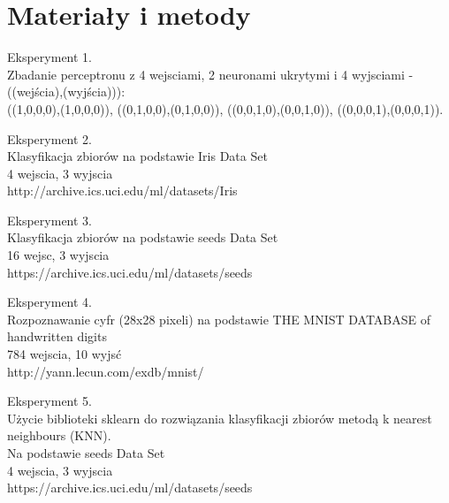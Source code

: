\documentclass{classrep}
\begin{document}
\section{Materiały i metody}
{Eksperyment 1.\\
Zbadanie perceptronu z 4 wejsciami, 2 neuronami ukrytymi i 4 wyjsciami - ((wejścia),(wyjścia))):\\
((1,0,0,0),(1,0,0,0)), ((0,1,0,0),(0,1,0,0)), ((0,0,1,0),(0,0,1,0)), ((0,0,0,1),(0,0,0,1)).\\
}

{Eksperyment 2.\\
Klasyfikacja zbiorów na podstawie Iris Data Set\\
4 wejscia, 3 wyjscia\\
http://archive.ics.uci.edu/ml/datasets/Iris\\
}

{Eksperyment 3.\\
Klasyfikacja zbiorów na podstawie seeds Data Set \\
16 wejsc, 3 wyjscia\\
https://archive.ics.uci.edu/ml/datasets/seeds\\
}

{Eksperyment 4.\\
Rozpoznawanie cyfr (28x28 pixeli) na podstawie THE MNIST DATABASE
of handwritten digits\\
784 wejscia, 10 wyjsć\\
http://yann.lecun.com/exdb/mnist/\\
}

{Eksperyment 5.\\
Użycie biblioteki sklearn do rozwiązania klasyfikacji zbiorów metodą k nearest neighbours (KNN).\\
Na podstawie seeds Data Set \\
4 wejscia, 3 wyjscia\\
https://archive.ics.uci.edu/ml/datasets/seeds\\
}
\end{document}
